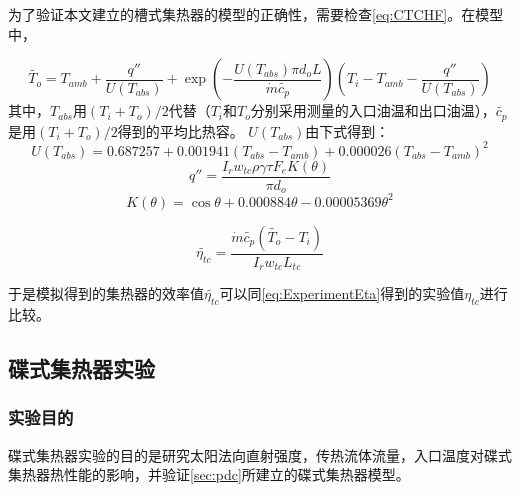 为了验证本文建立的槽式集热器的模型的正确性，需要检查\autoref{eq:CTCHF}。在模型中，

\begin{equation}
	\widetilde{T_{o}}=T_{amb} + \dfrac{q''}{U(T_{abs})} + \exp(-\frac{U(T_{abs})\pi d_o L}{\dot{m}\widetilde{c_p}})(T_{i}-T_{amb}-\dfrac{q''}{U(T_{abs})})
	\label{eq:CheckT_o}
\end{equation}
其中，$T_{abs}$用$(T_i + T_o)/2$代替（$T_i$和$T_o$分别采用测量的入口油温和出口油温），$\widetilde{c_p}$是用$(T_i + T_o)/2$得到的平均比热容。
$U(T_{abs})$由下式得到\cite{Romero2007}：
\begin{equation}
	U(T_{abs}) = 0.687257 + 0.001941(T_{abs} - T_{amb}) + 0.000026(T_{abs} - T_{amb})^2
	\label{eq:U_T_abs}
\end{equation}
\begin{equation}
	q'' = \frac{I_r w_{tc} \rho \gamma \tau F_e K(\theta)}{\pi d_o}
\end{equation}
\begin{equation}
	K(\theta) = \cos\theta+0.000884\theta-0.00005369\theta^2
\end{equation}

\begin{equation}
	\widetilde{\eta_{tc}} = \dfrac{\dot{m}\widetilde{c_p}(\widetilde{T_o}-T_i)}{I_rw_{tc}L_{tc}}
\end{equation}

于是模拟得到的集热器的效率值$\widetilde{\eta_{tc}}$可以同\autoref{eq:ExperimentEta}得到的实验值$\eta_{tc}$进行比较。

	
\subsection{碟式集热器实验}
\subsubsection{实验目的}
碟式集热器实验的目的是研究太阳法向直射强度，传热流体流量，入口温度对碟式集热器热性能的影响，并验证\autoref{sec:pdc}所建立的碟式集热器模型。

